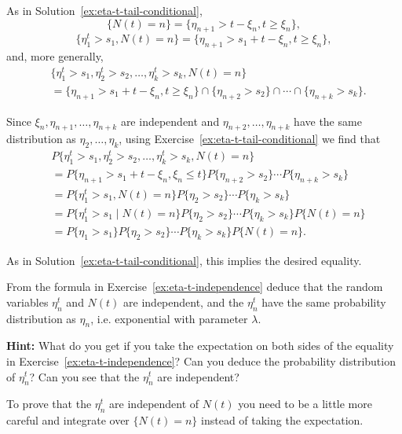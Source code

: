 \begin{Solution}
As in Solution~\ref{ex:eta-t-tail-conditional},
\[
\{N(t) = n\} = \{\eta_{n+1} > t - \xi_n, t \geq \xi_n\},
\]
\[
\{\eta_1^t > s_1, N(t) = n\} = \{\eta_{n+1} > s_1 + t - \xi_n, t \geq \xi_n\},
\]
and, more generally,
\begin{equation}
\begin{aligned}
&\{\eta_1^t > s_1, \eta_2^t > s_2, \ldots, \eta_k^t > s_k, N(t) = n\} \\
&= \{\eta_{n+1} > s_1 + t - \xi_n, t \geq \xi_n\} \cap \{\eta_{n+2} > s_2\} \cap \cdots \cap \{\eta_{n+k} > s_k\}.
\end{aligned}
\end{equation}

Since $\xi_n, \eta_{n+1}, \ldots, \eta_{n+k}$ are independent and $\eta_{n+2}, \ldots, \eta_{n+k}$ have the same distribution as $\eta_2, \ldots, \eta_k$, using Exercise~\ref{ex:eta-t-tail-conditional} we find that
\begin{equation}
\begin{aligned}
&P\{\eta_1^t > s_1, \eta_2^t > s_2, \ldots, \eta_k^t > s_k, N(t) = n\} \\
&= P\{\eta_{n+1} > s_1 + t - \xi_n, \xi_n \leq t\} P\{\eta_{n+2} > s_2\} \cdots P\{\eta_{n+k} > s_k\} \\
&= P\{\eta_1^t > s_1, N(t) = n\} P\{\eta_2 > s_2\} \cdots P\{\eta_k > s_k\} \\
&= P\{\eta_1^t > s_1 \mid N(t) = n\} P\{\eta_2 > s_2\} \cdots P\{\eta_k > s_k\} P\{N(t) = n\} \\
&= P\{\eta_1 > s_1\} P\{\eta_2 > s_2\} \cdots P\{\eta_k > s_k\} P\{N(t) = n\}.
\end{aligned}
\end{equation}

As in Solution~\ref{ex:eta-t-tail-conditional}, this implies the desired equality.
\end{Solution}

\begin{Exercise}
\label{ex:eta-t-distribution}
From the formula in Exercise~\ref{ex:eta-t-independence} deduce that the random variables $\eta_n^t$ and $N(t)$ are independent, and the $\eta_n^t$ have the same probability distribution as $\eta_n$, i.e. exponential with parameter $\lambda$.

\noindent\textbf{Hint:} What do you get if you take the expectation on both sides of the equality in Exercise~\ref{ex:eta-t-independence}? Can you deduce the probability distribution of $\eta_n^t$? Can you see that the $\eta_n^t$ are independent?

To prove that the $\eta_n^t$ are independent of $N(t)$ you need to be a little more careful and integrate over $\{N(t) = n\}$ instead of taking the expectation.
\end{Exercise}

